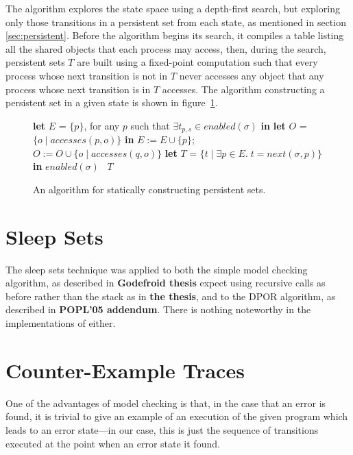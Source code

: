 \documentclass[12pt,a4paper,twoside,openright]{report}
\newcommand{\Let}[2]{\State \textbf{let} #1 = #2 \textbf{in}}
\begin{document}
The algorithm explores the state space using a
depth-first search, but exploring only those
transitions in a persistent set from each
state, as mentioned in section \ref{sec:persistent}.
Before the algorithm begins its search, it compiles a table
listing all the shared objects that each process may
access, then, during the search, persistent sets $T$ are built
using a fixed-point computation such that
every process whose next transition is
not in $T$ never accesses any
object that any process whose next
transition is in $T$ accesses.
The algorithm constructing a persistent set in a given state
is shown in figure~\ref{fig:spor-code}.

\begin{figure}
	\begin{algorithmic}[1]
		\Let{$E$}{$\{p\}$,
			for any $p$ such that
			$\exists t_{p,s} \in \textit{enabled}(\sigma)$}
		\Let{$O$}{$\{o \mid \textit{accesses}(p, o)\}$}
				\State $E := E \cup \{p\}$;
				\State $O := O \cup \{o \mid
					\textit{accesses}(q, o)\}$
				\EndIf
			\EndFor
		\EndWhile
		\Let{$T$}{$\{t \mid \exists p \in E.\;
					t = \textit{next}(\sigma,p)\}$}
			\Return $\textit{enabled}(\sigma)$
		\Else \ \Return $T$
		\EndIf
		\EndProcedure
	\end{algorithmic}
	\caption{An algorithm for statically constructing
		persistent sets.}
	\label{fig:spor-code}
\end{figure}

\section{Sleep Sets}

The sleep sets technique was applied
to both the simple model checking
algorithm, as described in \textbf{Godefroid
thesis} expect using recursive calls as before
rather than the stack as in \textbf{the thesis},
and to the DPOR algorithm, as described in
\textbf{POPL'05 addendum}. There is nothing
noteworthy in the implementations of either.

\section{Counter-Example Traces} \label{sec:traces}

One of the advantages of model checking
is that, in the case that
an error is found, it is trivial to give
an example of an execution of the given
program which leads to an error state---in
our case, this is just the sequence of
transitions executed at the point when
an error state it found.
\end{document}

